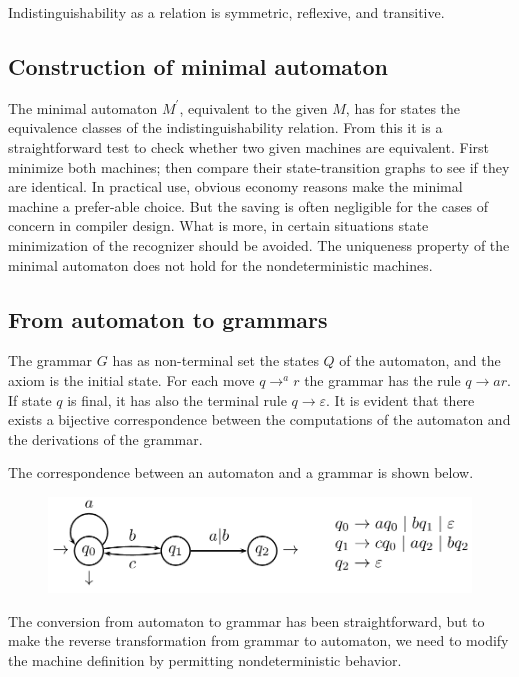 Indistinguishability as a relation is symmetric, reflexive, and transitive. 

\subsection*{Construction of minimal automaton}
The minimal automaton $M^{'}$, equivalent to the given $M$, has for states the equivalence classes of the indistinguishability relation. From this it is a 
straightforward test to check whether two given machines are equivalent. First minimize both machines; then compare their state-transition graphs to see if 
they are identical. In practical use, obvious economy reasons make the minimal machine a prefer-able  choice. But the saving is often negligible for  
the cases of concern in compiler design. What is more, in certain situations state minimization of the recognizer should be avoided. The uniqueness property 
of the minimal automaton does not hold for the nondeterministic machines. 

\subsection*{From automaton to grammars}
The grammar $G$ has as non-terminal set the states $Q$ of the automaton, and the axiom is the initial state. For each move $q \rightarrow^{a} r$ the grammar 
has the rule $q \rightarrow ar$. If state $q$ is final, it has also the terminal rule $q \rightarrow \varepsilon$. It is evident that there exists a bijective 
correspondence between the computations of the automaton and the derivations of the grammar. 
\begin{example}
    The correspondence between an automaton and a grammar is shown below. 
    \begin{figure}[H]
        \centering
        \includegraphics[width=0.9\linewidth]{images/autgram.png}
    \end{figure}
\end{example}
The conversion from automaton to grammar has been straightforward, but to make the reverse transformation from grammar to automaton, we need to 
modify the machine definition by permitting nondeterministic behavior.
